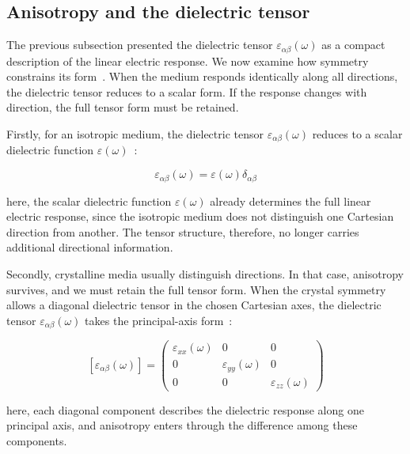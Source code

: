 \subsection{Anisotropy and the dielectric tensor}

The previous subsection presented the dielectric tensor $\varepsilon_{\alpha\beta}(\omega)$ as a compact description of the linear electric response.
We now examine how symmetry constrains its form~\cite{capper2019optical}.
When the medium responds identically along all directions, the dielectric tensor reduces to a scalar form.
If the response changes with direction, the full tensor form must be retained.

Firstly, for an isotropic medium,
the dielectric tensor $\varepsilon_{\alpha\beta}(\omega)$ reduces to a scalar dielectric function $\varepsilon(\omega)$~\cite{born2013principles}:

\begin{equation}
    \varepsilon_{\alpha\beta}(\omega)
    = \varepsilon(\omega)\delta_{\alpha\beta}
\label{isotropic_dielectric_tensor}
\end{equation}

here, the scalar dielectric function $\varepsilon(\omega)$ already determines the full linear electric response,
since the isotropic medium does not distinguish one Cartesian direction from another.
The tensor structure, therefore, no longer carries additional directional information.

Secondly, crystalline media usually distinguish directions.
In that case, anisotropy survives, and we must retain the full tensor form.
When the crystal symmetry allows a diagonal dielectric tensor in the chosen Cartesian axes,
the dielectric tensor $\varepsilon_{\alpha\beta}(\omega)$ takes the principal-axis form~\cite{nye1985physical}:

\begin{equation}
    \left[\varepsilon_{\alpha\beta}(\omega)\right] = \begin{pmatrix}
        \varepsilon_{xx}(\omega) & 0 & 0 \\
        0 & \varepsilon_{yy}(\omega) & 0 \\
        0 & 0 & \varepsilon_{zz}(\omega)
    \end{pmatrix}
\label{principal_axis_dielectric_tensor}
\end{equation}

here, each diagonal component describes the dielectric response along one principal axis,
and anisotropy enters through the difference among these components.

